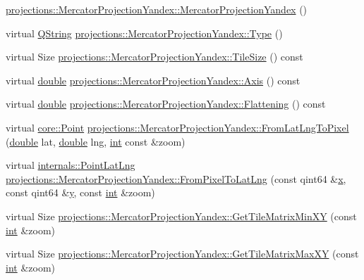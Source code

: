 \begin{DoxyCompactItemize}
\hyperlink{group___o_p_map_widget_gaebc460c991ff6702512b15ff65b33ece}{projections\-::\-Mercator\-Projection\-Yandex\-::\-Mercator\-Projection\-Yandex} ()
\item 
virtual \hyperlink{group___u_a_v_objects_plugin_gab9d252f49c333c94a72f97ce3105a32d}{Q\-String} \hyperlink{group___o_p_map_widget_gadfc14a9f761555a7472779402c2c0511}{projections\-::\-Mercator\-Projection\-Yandex\-::\-Type} ()
\item 
virtual Size \hyperlink{group___o_p_map_widget_ga54a0f175ca8a37d62e27a2a7916ac6f9}{projections\-::\-Mercator\-Projection\-Yandex\-::\-Tile\-Size} () const 
\item 
virtual \hyperlink{_super_l_u_support_8h_a8956b2b9f49bf918deed98379d159ca7}{double} \hyperlink{group___o_p_map_widget_ga8bcc6388e661bbc92a1fab57579f7364}{projections\-::\-Mercator\-Projection\-Yandex\-::\-Axis} () const 
\item 
virtual \hyperlink{_super_l_u_support_8h_a8956b2b9f49bf918deed98379d159ca7}{double} \hyperlink{group___o_p_map_widget_gafc15feecfe2d4b87734d398f18a6903b}{projections\-::\-Mercator\-Projection\-Yandex\-::\-Flattening} () const 
\item 
virtual \hyperlink{structcore_1_1_point}{core\-::\-Point} \hyperlink{group___o_p_map_widget_ga165e0f0502d73b38e1712e95eeaffb10}{projections\-::\-Mercator\-Projection\-Yandex\-::\-From\-Lat\-Lng\-To\-Pixel} (\hyperlink{_super_l_u_support_8h_a8956b2b9f49bf918deed98379d159ca7}{double} lat, \hyperlink{_super_l_u_support_8h_a8956b2b9f49bf918deed98379d159ca7}{double} lng, \hyperlink{ioapi_8h_a787fa3cf048117ba7123753c1e74fcd6}{int} const \&zoom)
\item 
virtual \hyperlink{structinternals_1_1_point_lat_lng}{internals\-::\-Point\-Lat\-Lng} \hyperlink{group___o_p_map_widget_ga05a8dfb0d9ffc159da5776934f61d6ee}{projections\-::\-Mercator\-Projection\-Yandex\-::\-From\-Pixel\-To\-Lat\-Lng} (const qint64 \&\hyperlink{glext_8h_a1db9d104e3c2128177f26aff7b46982f}{x}, const qint64 \&\hyperlink{glext_8h_a42315f3ed8fff752bb47fd782309fcfc}{y}, const \hyperlink{ioapi_8h_a787fa3cf048117ba7123753c1e74fcd6}{int} \&zoom)
\item 
virtual Size \hyperlink{group___o_p_map_widget_gae31d23a05a2c6771d8a5c2557d51f2dc}{projections\-::\-Mercator\-Projection\-Yandex\-::\-Get\-Tile\-Matrix\-Min\-X\-Y} (const \hyperlink{ioapi_8h_a787fa3cf048117ba7123753c1e74fcd6}{int} \&zoom)
\item 
virtual Size \hyperlink{group___o_p_map_widget_ga7ecba9178be61022f6e533b06422a17e}{projections\-::\-Mercator\-Projection\-Yandex\-::\-Get\-Tile\-Matrix\-Max\-X\-Y} (const \hyperlink{ioapi_8h_a787fa3cf048117ba7123753c1e74fcd6}{int} \&zoom)

\end{DoxyCompactItemize}
